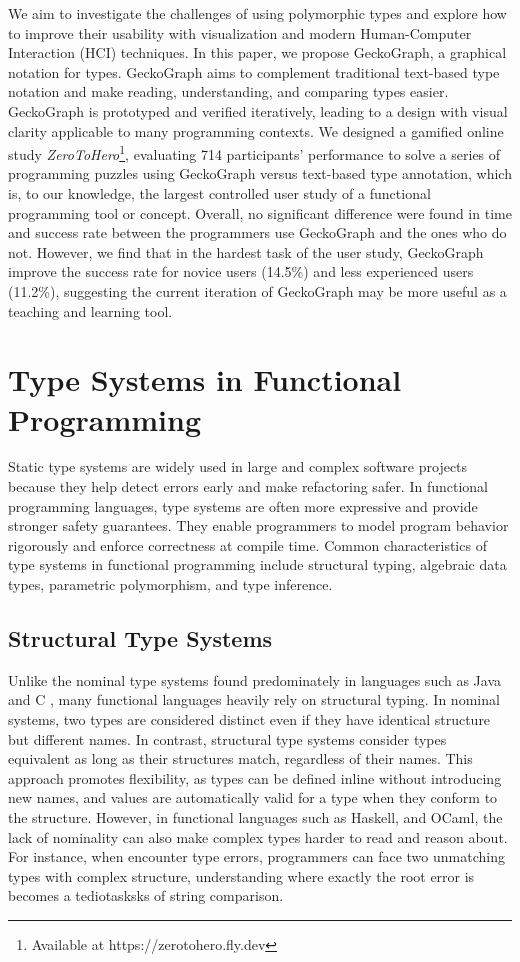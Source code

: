 \documentclass[preprint,12pt]{elsarticle}
\begin{document}
 We aim to investigate the challenges of using polymorphic types and explore how to improve their usability with visualization and modern Human-Computer Interaction (HCI) techniques. In this paper, we propose GeckoGraph, a graphical notation for types. GeckoGraph aims to complement traditional text-based type notation and make reading, understanding, and comparing types easier. GeckoGraph is prototyped and verified iteratively, leading to a design with visual clarity applicable to many programming contexts. We designed a gamified online study  \textit{ZeroToHero}\footnote{Available at https://zerotohero.fly.dev}, evaluating 714 participants' performance to solve a series of programming puzzles using GeckoGraph versus text-based type annotation, which is, to our knowledge, the largest controlled user study of a functional programming tool or concept.  Overall, no significant difference were found  in time and success rate between the programmers use GeckoGraph and the ones who do not. However, we find that in the hardest task of the user study, GeckoGraph improve the success rate for novice users (14.5\%) and less experienced users (11.2\%), suggesting the current iteration of GeckoGraph may be more useful as a teaching and learning tool.

\section{Type Systems in Functional Programming}

Static type systems are widely used in large and complex software projects because they help detect errors early and make refactoring safer. In functional programming languages, type systems are often more expressive and provide stronger safety guarantees. They enable programmers to model program behavior rigorously and enforce correctness at compile time. Common characteristics of type systems in functional programming include structural typing, algebraic data types, parametric polymorphism, and type inference.

\subsection{Structural Type Systems}

Unlike the nominal type systems found predominately in languages such as Java and C \cite{AbdelGawad2013-hh}, many functional languages heavily rely on structural typing. In nominal systems, two types are considered distinct even if they have identical structure but different names. In contrast, structural type systems consider types equivalent as long as their structures match, regardless of their names. This approach promotes flexibility, as types can be defined inline without introducing new names, and values are automatically valid for a type when they conform to the structure.  However, in functional languages such as Haskell, and OCaml, the lack of nominality can also make complex types harder to read and reason about. For instance, when encounter type errors, programmers can face two unmatching types with complex structure, understanding where exactly the root error is becomes a tediotasksks of string comparison.
\end{document}
